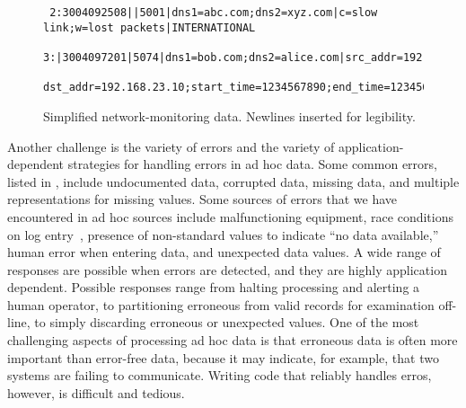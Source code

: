 \begin{figure}
  \centering
  \small
\begin{verbatim}
 2:3004092508||5001|dns1=abc.com;dns2=xyz.com|c=slow link;w=lost packets|INTERNATIONAL
 3:|3004097201|5074|dns1=bob.com;dns2=alice.com|src_addr=192.168.0.10;
 dst_addr=192.168.23.10;start_time=1234567890;end_time=1234568000;cycle_time=17412|SPECIAL
\end{verbatim}  
  \caption{Simplified network-monitoring data. Newlines 
inserted for legibility.}
  \label{fig:darkstar-records1}
\end{figure}



Another challenge is the variety of errors and the
variety of application-dependent strategies for handling errors in ad
hoc data.  Some common errors, listed in ,
include undocumented data, corrupted data, missing data, and multiple
representations for missing values.  Some sources of errors
that we have encountered in ad hoc sources include malfunctioning
equipment, race conditions on log entry~\cite{wpp}, presence of
non-standard values to indicate ``no data available,'' human error
when entering data, and unexpected data values.  A wide range of
responses are possible when errors are detected, and they are highly
application dependent.  Possible responses range from halting processing
and alerting a human operator, to partitioning erroneous from valid
records for examination off-line, to simply discarding erroneous or
unexpected values.  One of the most challenging aspects of processing
ad hoc data is that erroneous data is often more important than
error-free data, because it may indicate, for example, that two
systems are failing to communicate.  Writing code that reliably
handles erros, however, is difficult and tedious.

